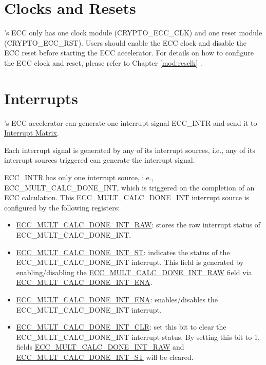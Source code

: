 \documentclass[main\_\_EN.tex]{subfiles}
\begin{document}
\section{Clocks and Resets} 
\chipname{}'s ECC only has one clock module (CRYPTO\_ECC\_CLK) and one reset module (CRYPTO\_ECC\_RST). Users should enable the ECC clock and disable the ECC reset before starting the ECC accelerator. For details on how to configure the ECC clock and reset, please refer to Chapter \ref{mod:resclk} \textit{}.


\section{Interrupts}
\label{sec:ecc-interrupt}
\chipname{}'s ECC accelerator can generate one interrupt signal ECC\_INTR and send it to \hyperref[mod:intmtrx]{Interrupt Matrix}.

\begin{tiplisting}
Each interrupt signal is generated by any of its interrupt sources, i.e., any of its interrupt sources triggered can generate the interrupt signal. 
\end{tiplisting}

ECC\_INTR has only one interrupt source, i.e., \label{int:ECCMULTCALCDONEINT}ECC\_MULT\_CALC\_DONE\_INT, which is triggered on the completion of an ECC calculation. This ECC\_MULT\_CALC\_DONE\_INT interrupt source is configured by the following registers:

\begin{itemize}
    \item \hyperref[fielddesc:ECCMULTCALCDONEINTRAW]{ECC\_MULT\_CALC\_DONE\_INT\_RAW}: stores the raw interrupt status of ECC\_MULT\_CALC\_DONE\_INT.
    \item \hyperref[fielddesc:ECCMULTCALCDONEINTST]{ECC\_MULT\_CALC\_DONE\_INT\_ST}: indicates the status of the ECC\_MULT\_CALC\_DONE\_INT interrupt. This field is generated by enabling/disabling the \hyperref[fielddesc:ECCMULTCALCDONEINTRAW]{ECC\_MULT\_CALC\_DONE\_INT\_RAW} field via \hyperref[fielddesc:ECCMULTCALCDONEINTENA]{ECC\_MULT\_CALC\_DONE\_INT\_ENA}.
    \item \hyperref[fielddesc:ECCMULTCALCDONEINTENA]{ECC\_MULT\_CALC\_DONE\_INT\_ENA}: enables/disables the ECC\_MULT\_CALC\_DONE\_INT interrupt.
    \item \hyperref[fielddesc:ECCMULTCALCDONEINTCLR]{ECC\_MULT\_CALC\_DONE\_INT\_CLR}: set this bit to clear the ECC\_MULT\_CALC\_DONE\_INT interrupt status. By setting this bit to 1, fields \hyperref[fielddesc:ECCMULTCALCDONEINTRAW]{ECC\_MULT\_CALC\_DONE\_INT\_RAW} and  \hyperref[fielddesc:ECCMULTCALCDONEINTST]{ECC\_MULT\_CALC\_DONE\_INT\_ST} will be cleared.
\end{itemize}
\end{document}
